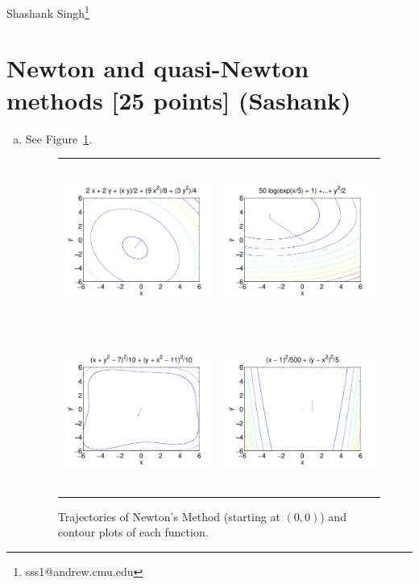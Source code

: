\documentclass[11pt]{article}
\begin{document}
Shashank Singh\footnote{sss1@andrew.cmu.edu}
\setcounter{section}{2}
\section{Newton and quasi-Newton methods [25 points] (Sashank)}
\begin{enumerate}[(a)]
\item See Figure~\ref{fig:3a}.
\begin{figure}[h]
\centering
\begin{tabular}{cc}
\includegraphics[width=200pt,height=150pt]{3a1}   &
    \includegraphics[width=200pt,height=150pt]{3a2}  \\
\includegraphics[width=200pt,height=150pt]{3a3}   &
    \includegraphics[width=200pt,height=150pt]{3a4}
\end{tabular}
\caption{Trajectories of Newton's Method (starting at $(0,0)$) and contour
plots of each function.}
\label{fig:3a}
\end{figure}


\end{enumerate}
\end{document}
